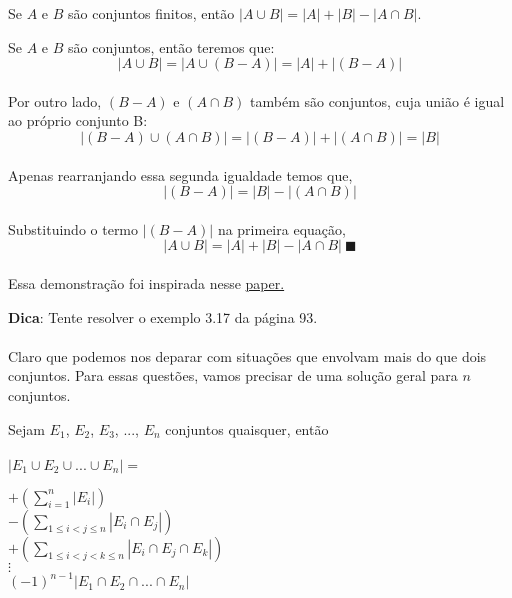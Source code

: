 \documentclass[main.tex]{subfiles}
\begin{document}
\begin{fact}
Se $A$ e $B$ são conjuntos finitos, então $|A \cup B| = |A| + |B| - |A \cap B|$.
\end{fact}

\begin{demonstration}
Se $A$ e $B$ são conjuntos, então teremos que:
\\
$$ |A \cup B| =  |A \cup (B - A)| = |A| + |(B-A)| $$
\\
Por outro lado, $(B-A)$ e $(A \cap B)$ também são conjuntos, cuja união é igual ao próprio conjunto B:
\\
$$ |(B - A) \cup (A \cap B)| = |(B - A)| + |(A \cap B)| = |B|$$
\\
Apenas rearranjando essa segunda igualdade temos que,
\\
$$ |(B - A)| = |B| - |(A \cap B)| $$
\\
Substituindo o termo $|(B - A)|$ na primeira equação, 
\\
$$ |A \cup B| = |A| + |B| - |A \cap B| \ \blacksquare $$
\\
Essa demonstração foi inspirada nesse \href{https://people.maths.bris.ac.uk/~mb13434/incl_excl_n.pdf}{paper.}

\end{demonstration}

\textbf{Dica}: Tente resolver o exemplo 3.17 da página 93.
\\~\\
Claro que podemos nos deparar com situações que envolvam mais do que dois conjuntos. Para essas questões, vamos precisar de uma solução geral para $n$ conjuntos.

\begin{fact}
Sejam $E_1$, $E_2$, $E_3$, ..., $E_n$ conjuntos quaisquer, então
\\~\\
$ |E_1 \cup E_2 \cup ... \cup E_n| = $
\begin{center}
$ + \left( \displaystyle \sum_{i = 1}^{n} |E_i| \right)$ \\
$ - \left( \displaystyle \sum_{1 \leq i < j \leq n} |E_i \cap E_j| \right) $ \\
$ + \left( \displaystyle \sum_{1 \leq i < j < k \leq n} |E_i \cap E_j \cap E_k | \right) $ \\
$ \vdots $ \\
\large $ (-1)^{n-1} |E_1 \cap E_2 \cap ... \cap E_n| $ 
\end{center}
\end{fact}
\end{document}
